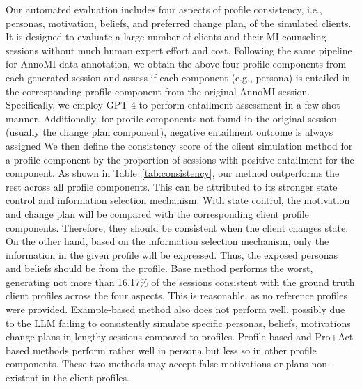 Our automated evaluation includes four aspects of profile consistency, i.e., personas, motivation, beliefs, and preferred change plan, of the simulated clients. It is designed to evaluate a large number of clients and their MI counseling sessions without much human expert effort and cost.
Following the same pipeline for AnnoMI data annotation, we obtain the above four profile components from each generated session and assess if each component (e.g., persona) is entailed in the corresponding profile component from the original AnnoMI session. Specifically, we employ GPT-4 to perform entailment assessment in a few-shot manner. Additionally, for profile components not found in the original session (usually the change plan component), negative entailment outcome is always assigned 
We then define the consistency score of the client simulation method for a profile component by the proportion of sessions with positive entailment for the component. As shown in Table~\ref{tab:consistency}, our method outperforms the rest across all profile components.  This can be attributed to its stronger state control and information selection mechanism. With state control, the motivation and change plan will be compared with the corresponding client profile components. Therefore, they should be consistent when the client changes state. On the other hand, based on the information selection mechanism, only the information in the given profile will be expressed. Thus, the exposed personas and beliefs should be from the profile.  Base method performs the worst, generating not more than 16.17\% of the sessions consistent with the ground truth client profiles across the four aspects. This is reasonable, as no reference profiles were provided. Example-based method also does not perform well, possibly due to the LLM failing to consistently simulate specific personas, beliefs, motivations change plans in lengthy sessions compared to profiles.  Profile-based and Pro+Act-based methods perform rather well in persona but less so in other profile components. These two methods may accept false motivations or plans non-existent in the client profiles. 

